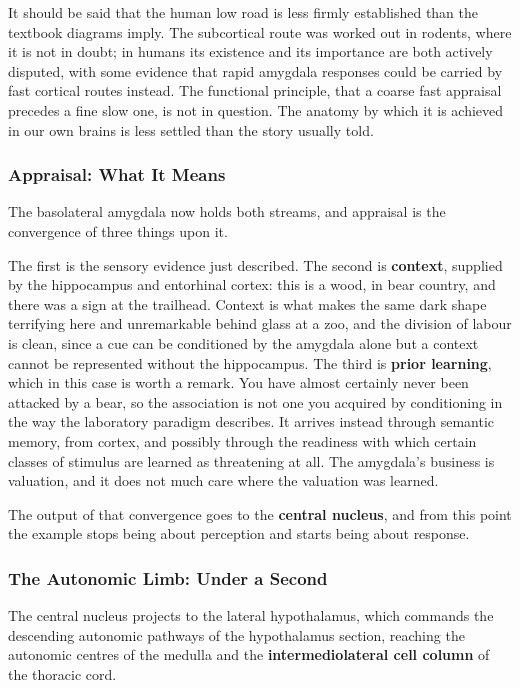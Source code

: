 \documentclass[11pt]{article}
\begin{document}
It should be said that the human low road is less firmly established than the textbook diagrams imply. The subcortical route was worked out in rodents, where it is not in doubt; in humans its existence and its importance are both actively disputed, with some evidence that rapid amygdala responses could be carried by fast cortical routes instead. The functional principle, that a coarse fast appraisal precedes a fine slow one, is not in question. The anatomy by which it is achieved in our own brains is less settled than the story usually told.

\subsubsection{Appraisal: What It Means}

The basolateral amygdala now holds both streams, and appraisal is the convergence of three things upon it.

The first is the sensory evidence just described. The second is \textbf{context}, supplied by the hippocampus and entorhinal cortex: this is a wood, in bear country, and there was a sign at the trailhead. Context is what makes the same dark shape terrifying here and unremarkable behind glass at a zoo, and the division of labour is clean, since a cue can be conditioned by the amygdala alone but a context cannot be represented without the hippocampus. The third is \textbf{prior learning}, which in this case is worth a remark. You have almost certainly never been attacked by a bear, so the association is not one you acquired by conditioning in the way the laboratory paradigm describes. It arrives instead through semantic memory, from cortex, and possibly through the readiness with which certain classes of stimulus are learned as threatening at all. The amygdala's business is valuation, and it does not much care where the valuation was learned.

The output of that convergence goes to the \textbf{central nucleus}, and from this point the example stops being about perception and starts being about response.

\subsubsection{The Autonomic Limb: Under a Second}

The central nucleus projects to the lateral hypothalamus, which commands the descending autonomic pathways of the hypothalamus section, reaching the autonomic centres of the medulla and the \textbf{intermediolateral cell column} of the thoracic cord.
\end{document}
